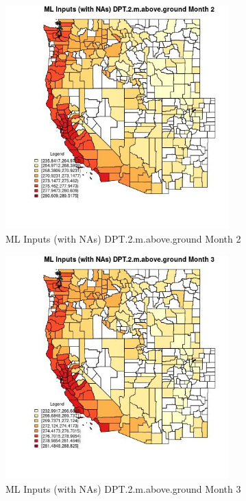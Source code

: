 \begin{figure} 
\centering  
\includegraphics[width=0.77\textwidth]{Code_Outputs/Report_ML_input_PM25_Step4_part_f_de_duplicated_aveswNAs_CountyDPT2mabovegroundmedianMonth2.jpg} 
\caption{\label{fig:Report_ML_input_PM25_Step4_part_f_de_duplicated_aveswNAsCountyDPT2mabovegroundmedianMonth2}ML Inputs (with NAs) DPT.2.m.above.ground Month 2} 
\end{figure} 
 

\begin{figure} 
\centering  
\includegraphics[width=0.77\textwidth]{Code_Outputs/Report_ML_input_PM25_Step4_part_f_de_duplicated_aveswNAs_CountyDPT2mabovegroundmedianMonth3.jpg} 
\caption{\label{fig:Report_ML_input_PM25_Step4_part_f_de_duplicated_aveswNAsCountyDPT2mabovegroundmedianMonth3}ML Inputs (with NAs) DPT.2.m.above.ground Month 3} 
\end{figure} 
 

